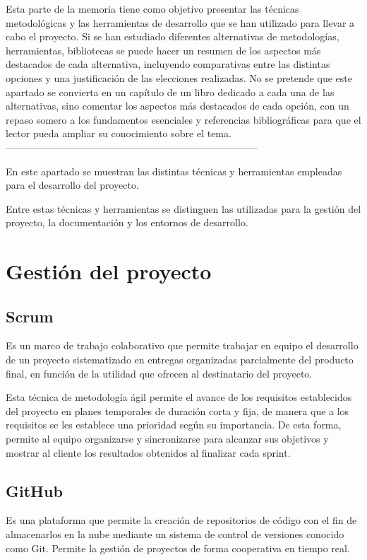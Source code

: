 
Esta parte de la memoria tiene como objetivo presentar las técnicas metodológicas y las herramientas de desarrollo que se han utilizado para llevar a cabo el proyecto. Si se han estudiado diferentes alternativas de metodologías, herramientas, bibliotecas se puede hacer un resumen de los aspectos más destacados de cada alternativa, incluyendo comparativas entre las distintas opciones y una justificación de las elecciones realizadas. 
No se pretende que este apartado se convierta en un capítulo de un libro dedicado a cada una de las alternativas, sino comentar los aspectos más destacados de cada opción, con un repaso somero a los fundamentos esenciales y referencias bibliográficas para que el lector pueda ampliar su conocimiento sobre el tema.
-----------------------------------------------------------------------------

En este apartado se muestran las distintas técnicas y herramientas empleadas para el desarrollo del proyecto.

Entre estas técnicas y herramientas se distinguen las utilizadas para la gestión del proyecto, la documentación y los entornos de desarrollo.

\section{Gestión del proyecto}
\subsection{Scrum}
\cite{Scrum1_bib} Es un marco de trabajo colaborativo que permite trabajar en equipo el desarrollo de un proyecto sistematizado en entregas organizadas parcialmente del producto final, en función de la utilidad que ofrecen al destinatario del proyecto. 

\cite{Scrum2_bib} Esta técnica de metodología ágil permite el avance de los requisitos establecidos del proyecto en planes temporales de duración corta y fija, de manera que a los requisitos se les establece una prioridad según su importancia. De esta forma, permite al equipo organizarse y sincronizarse para alcanzar sus objetivos y mostrar al cliente los resultados obtenidos al finalizar cada sprint.

\subsection{GitHub}
\cite{GitHub1_bib} Es una plataforma que permite la creación de repositorios de código con el fin de almacenarlos en la nube mediante un sistema de control de versiones conocido como Git. Permite la gestión de proyectos de forma cooperativa en tiempo real.

